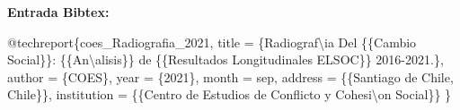 \documentclass[
  12pt,
]{book}
\newenvironment{Shaded}{\begin{snugshade}}{\end{snugshade}}
\newcommand{\NormalTok}[1]{#1}
\newcommand{\OtherTok}[1]{\textcolor[rgb]{0.56,0.35,0.01}{#1}}
\newcommand{\SpecialCharTok}[1]{\textcolor[rgb]{0.00,0.00,0.00}{#1}}
\newcommand{\StringTok}[1]{\textcolor[rgb]{0.31,0.60,0.02}{#1}}
\begin{document}
\textbf{Entrada Bibtex:}

\begin{Shaded}
\begin{Highlighting}[]
\SpecialCharTok{@}\NormalTok{techreport\{coes\_Radiografia\_2021,}
\NormalTok{  title }\OtherTok{=}\NormalTok{ \{Radiograf\textbackslash{}}\StringTok{\textquotesingle{}ia Del \{\{Cambio Social\}\}: \{\{An}\SpecialCharTok{\textbackslash{}\textquotesingle{}}\StringTok{alisis\}\} de \{\{Resultados Longitudinales ELSOC\}\} 2016{-}2021.\},}
\StringTok{  author = \{COES\},}
\StringTok{  year = \{2021\},}
\StringTok{  month = sep,}
\StringTok{  address = \{\{Santiago de Chile, Chile\}\},}
\StringTok{  institution = \{\{Centro de Estudios de Conflicto y Cohesi}\SpecialCharTok{\textbackslash{}\textquotesingle{}}\StringTok{on Social\}\}}
\StringTok{\}}
\end{Highlighting}
\end{Shaded}
\end{document}
